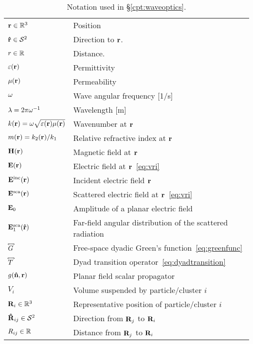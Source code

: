 \begin{table}[h!]
	\centering
    \caption[Notation used in \S\ref{cpt:waveoptics}]{\label{tab:waveoptics:notation}
    	Notation used in \S\ref{cpt:waveoptics}.
    }
	\renewcommand{\arraystretch}{1.2}
    \begin{tabular}{ll}
        $\mathbf{r}\in\mathbb{R}^3$ & Position \\
        $\mathbf{\hat{r}}\in\mathcal{S}^2$ & Direction to $\mathbf{r}$. \\
        $r\in\mathbb{R}$ & Distance. \\
        \hline
        $\varepsilon(\mathbf{r})$ & Permittivity \\
        $\mu(\mathbf{r})$ & Permeability \\
        $\omega$ & Wave angular frequency [1/s] \\
        $\lambda=2\pi\omega^{-1}$ & Wavelength [m] \\
        $k(\mathbf{r})=\omega\sqrt{\varepsilon(\mathbf{r})\mu(\mathbf{r})}$ & Wavenumber at $\mathbf{r}$\\
        $m(\mathbf{r})=k_2(\mathbf{r})/k_1$ & Relative refractive index at $\mathbf{r}$ \\
        \hline
        $\mathbf{H}(\mathbf{r})$ & Magnetic field at $\mathbf{r}$ \\
        $\mathbf{E}(\mathbf{r})$   & Electric field at $\mathbf{r}$~\eqref{eq:vri}  \\
        $\mathbf{E}^\text{inc}(\mathbf{r})$ & Incident electric field $\mathbf{r}$\\
        $\mathbf{E}^\text{sca}(\mathbf{r})$ & Scattered electric field at $\mathbf{r}$~\eqref{eq:vri}\\ 
        $\mathbf{E}_0$ & Amplitude of a planar electric field \\
        $\mathbf{E}^\text{sca}_1(\mathbf{\hat{r}})$ & Far-field angular distribution of the scattered radiation  \\
        \hline
        $\accentset{\Longleftrightarrow}{G}$ & Free-space dyadic Green's function~\eqref{eq:greenfunc} \\
        $\accentset{\Longleftrightarrow}{T}$ & Dyad transition operator~\eqref{eq:dyadtransition}\\
        $g(\mathbf{\hat{n}},\mathbf{r})$ & Planar field scalar propagator \\
        \hline
        \hline
        $V_i$ & Volume suspended by particle/cluster $i$ \\
        $\mathbf{R}_i\in\mathbb{R}^3$ & Representative position of particle/cluster $i$ \\
        $\mathbf{\hat{R}}_{ij}\in\mathcal{S}^2$ & Direction from $\mathbf{R}_j$ to $\mathbf{R}_i$\\
        $R_{ij}\in\mathbb{R}$ & Distance from $\mathbf{R}_j$ to $\mathbf{R}_i$\\

\end{tabular}
\end{table}
